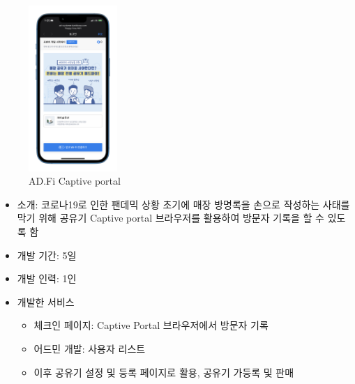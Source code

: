 \begin{itemize}[label=]
\begin{itemize}[label=]
\begin{figure}[!ht]
\begin{fullwidth}
{					            \includegraphics[width=0.3\textwidth]{images/ad-fi-reward.png}
					            \caption*{AD.Fi Captive portal}
				            }
			            \end{fullwidth}
		            \end{figure}
	      \end{itemize}

\end{itemize}


\label{logfi}

\begin{itemize}[label=]
	\item 소개: 코로나19로 인한 팬데믹 상황 초기에 매장 방명록을 손으로 작성하는 사태를 막기 위해 공유기 Captive portal 브라우저를 활용하여 방문자 기록을 할 수 있도록 함
	\item 개발 기간: 5일
	\item 개발 인력: 1인
	\item 개발한 서비스
	      \begin{itemize}[label=]
		      \item 체크인 페이지: Captive Portal 브라우저에서 방문자 기록
		      \item 어드민 개발: 사용자 리스트
		      \item 이후 공유기 설정 및 등록 페이지로 활용, 공유기 가등록 및 판매
	      \end{itemize}
\end{itemize}


